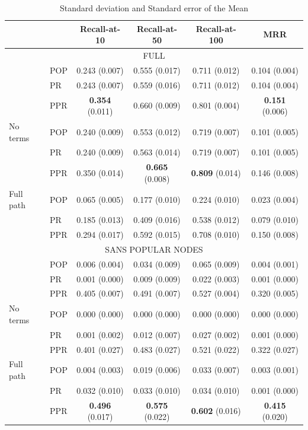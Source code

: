 \documentclass[11pt,oneside]{book}
\begin{document}
\begin{table}[p]
\centering
\caption{Standard deviation and Standard error of the Mean}
\label{table:std_ste}
\begin{tabular}{llcccc} \hline
	& & Recall-at-10 & Recall-at-50 & Recall-at-100 & MRR	 \\
\hline
\multicolumn{6}{c}{FULL} \\
\hline
& POP & 0.243 (0.007) & 0.555 (0.017) & 0.711 (0.012) & 0.104 (0.004) \\
& PR & 	0.243 (0.007) & 0.559 (0.016) & 0.711 (0.012) & 0.104 (0.004) \\
& PPR	& \textbf{0.354}	(0.011) & 0.660	(0.009) & 0.801 (0.004) & \textbf{0.151}	(0.006) \\
\hline
No terms & POP & 0.240 (0.009) & 0.553 (0.012) & 0.719 (0.007) & 0.101 (0.005) \\
& PR & 0.240 (0.009) & 0.563 (0.014) & 0.719 (0.007) & 0.101 (0.005) \\
& PPR	& 0.350	(0.014) & \textbf{0.665}	(0.008) & \textbf{0.809}	(0.014) & 0.146	(0.008) \\
\hline
Full path & POP & 0.065 (0.005) & 0.177 (0.010) & 0.224 (0.010) & 0.023 (0.004) \\
& PR & 0.185 (0.013) & 0.409 (0.016) & 0.538 (0.012) & 0.079 (0.010) \\
& PPR	& 0.294	(0.017) & 0.592	(0.015) & 0.708	(0.010) & 0.150	(0.008) \\
\hline
\multicolumn{6}{c}{SANS POPULAR NODES} \\
\hline
 & POP & 	0.006 (0.004) & 0.034 (0.009) & 0.065 (0.009) & 0.004 (0.001) \\
 & PR	& 0.001	(0.000) & 0.009	(0.009) & 0.022	(0.003) & 0.001	(0.000) \\
& PPR	& 0.405	(0.007) & 0.491 (0.007) & 0.527	(0.004) & 0.320	(0.005) \\
\hline
No terms & POP & 	0.000 (0.000) & 0.000 (0.000) & 0.000 (0.000) & 0.000 (0.000) \\
& PR & 	0.001 (0.002) & 0.012 (0.007) & 0.027 (0.002) & 0.001 (0.000) \\
& PPR & 	0.401 (0.027) & 0.483 (0.027) & 0.521 (0.022) & 0.322 (0.027) \\
\hline
Full path & POP & 	0.004 (0.003) & 0.019 (0.006) & 0.033 (0.007) & 0.003 (0.001) \\
& PR & 	0.032 (0.010) & 0.033 (0.010) & 0.034 (0.010) & 0.001 (0.000) \\
& PPR	& \textbf{0.496}	(0.017) & \textbf{0.575}	(0.022) & \textbf{0.602}	(0.016) & \textbf{0.415}	(0.020) \\
\hline
\end{tabular}
\end{table}
\end{document}
